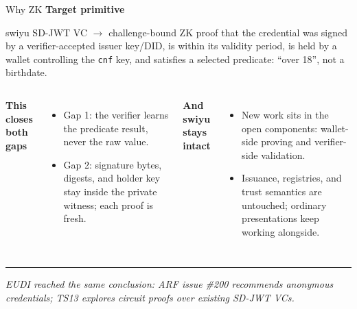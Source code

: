 \documentclass[aspectratio=169]{beamer}
\newcommand{\sourcefoot}{}
\newcommand{\setsources}[1]{\renewcommand{\sourcefoot}{#1}}
\newcommand{\labelhead}[1]{{\small\bfseries\color{zkblue}#1}\par\vspace{0.25em}}
\newcommand{\takeaway}[1]{%
  \vspace{0.45em}%
  {\color{zkrule}\rule{\linewidth}{0.5pt}}\par
  \vspace{0.3em}%
  {\small\itshape\color{zkmuted}#1\par}}
\begin{document}
\setsources{\href{https://github.com/eu-digital-identity-wallet/eudi-doc-architecture-and-reference-framework/issues/200}{EUDI ARF issue \#200}; \href{https://github.com/eu-digital-identity-wallet/eudi-doc-standards-and-technical-specifications/blob/main/docs/technical-specifications/ts13-zksnarks.md}{EUDI TS13}; \href{https://swiyu-admin-ch.github.io/open-source-components/}{Open Source Components}}
\begin{frame}{Why ZK}
  \labelhead{Target primitive}
  swiyu SD-JWT VC $\rightarrow$ challenge-bound ZK proof that the credential was
  signed by a verifier-accepted issuer key/DID, is within its validity period,
  is held by a wallet controlling the \texttt{cnf} key, and satisfies a selected
  predicate: ``over 18'', not a birthdate.

  \vspace{0.25em}
  \begin{columns}[T,onlytextwidth]
      \labelhead{This closes both gaps}
      \begin{itemize}
        \item Gap 1: the verifier learns the predicate result, never the raw value.
        \item Gap 2: signature bytes, digests, and holder key stay inside the
          private witness; each proof is fresh.
      \end{itemize}

      \labelhead{And swiyu stays intact}
      \begin{itemize}
        \item New work sits in the open components: wallet-side proving and
          verifier-side validation.
        \item Issuance, registries, and trust semantics are untouched; ordinary
          presentations keep working alongside.
      \end{itemize}
  \end{columns}

  \takeaway{EUDI reached the same conclusion: ARF issue \#200 recommends
  anonymous credentials; TS13 explores circuit proofs over existing SD-JWT VCs.}
\end{frame}
\end{document}
